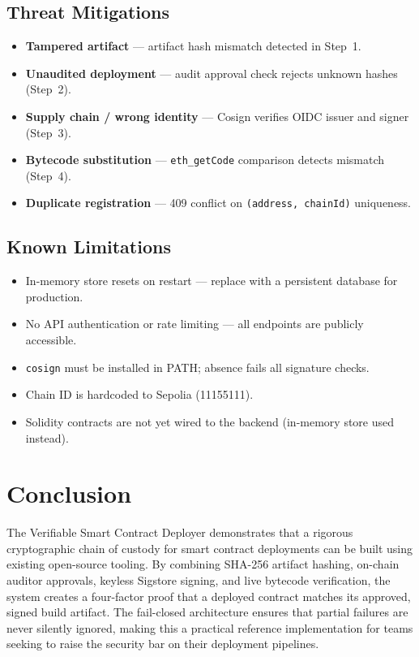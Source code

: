 \documentclass[11pt,a4paper]{article}
\begin{document}
\subsection{Threat Mitigations}
\begin{itemize}[leftmargin=1.5em,itemsep=1pt]
  \item \textbf{Tampered artifact} — artifact hash mismatch detected in Step~1.
  \item \textbf{Unaudited deployment} — audit approval check rejects unknown hashes (Step~2).
  \item \textbf{Supply chain / wrong identity} — Cosign verifies OIDC issuer and signer (Step~3).
  \item \textbf{Bytecode substitution} — \texttt{eth\_getCode} comparison detects mismatch (Step~4).
  \item \textbf{Duplicate registration} — 409 conflict on \texttt{(address, chainId)} uniqueness.
\end{itemize}

\subsection{Known Limitations}
\begin{itemize}[leftmargin=1.5em,itemsep=1pt]
  \item In-memory store resets on restart — replace with a persistent database for production.
  \item No API authentication or rate limiting — all endpoints are publicly accessible.
  \item \texttt{cosign} must be installed in PATH; absence fails all signature checks.
  \item Chain ID is hardcoded to Sepolia (11155111).
  \item Solidity contracts are not yet wired to the backend (in-memory store used instead).
\end{itemize}

\section{Conclusion}

The Verifiable Smart Contract Deployer demonstrates that a rigorous cryptographic
chain of custody for smart contract deployments can be built using existing open-source
tooling. By combining SHA-256 artifact hashing, on-chain auditor approvals, keyless
Sigstore signing, and live bytecode verification, the system creates a four-factor proof
that a deployed contract matches its approved, signed build artifact. The fail-closed
architecture ensures that partial failures are never silently ignored, making this a
practical reference implementation for teams seeking to raise the security bar on their
deployment pipelines.
\end{document}
